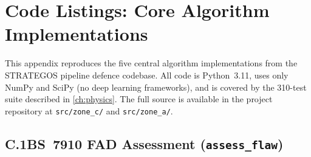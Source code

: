 
\chapter{Code Listings: Core Algorithm Implementations}
\label{app:code}

This appendix reproduces the five central algorithm implementations
from the STRATEGOS pipeline defence codebase.  All code is Python~3.11,
uses only NumPy and SciPy (no deep learning frameworks), and is
covered by the 310-test suite described in \cref{ch:physics}.
The full source is available in the project repository at
\texttt{src/zone\_c/} and \texttt{src/zone\_a/}.

\section*{C.1\quad BS~7910 FAD Assessment (\texttt{assess\_flaw})}

\lstset{style=pythonstyle}

